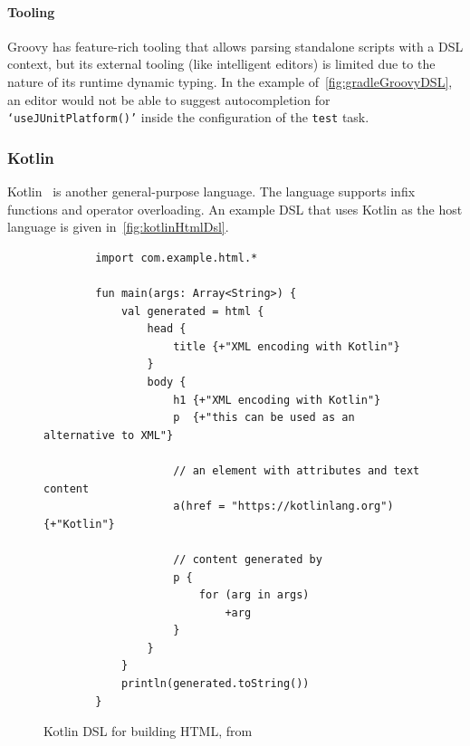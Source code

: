 \paragraph{Tooling} Groovy has feature-rich tooling that allows parsing standalone scripts with a DSL context, but its external tooling (like intelligent editors) is limited due to the nature of its runtime dynamic typing.
In the example of~\autoref{fig:gradleGroovyDSL}, an editor would not be able to suggest autocompletion for \texttt{`useJUnitPlatform()'} inside the configuration of the \texttt{test} task.

\subsubsection{Kotlin}\label{subsubsec:kotlinLang}

Kotlin~\cite{kotlinLang} is another general-purpose language.
The language supports infix functions and operator overloading.
An example DSL that uses Kotlin as the host language is given in~\autoref{fig:kotlinHtmlDsl}.

\begin{figure}[h]
    \centering
    \begin{minipage}{0.9\textwidth}
        \begin{verbatim}
        import com.example.html.*

        fun main(args: Array<String>) {
            val generated = html {
                head {
                    title {+"XML encoding with Kotlin"}
                }
                body {
                    h1 {+"XML encoding with Kotlin"}
                    p  {+"this can be used as an alternative to XML"}

                    // an element with attributes and text content
                    a(href = "https://kotlinlang.org") {+"Kotlin"}

                    // content generated by
                    p {
                        for (arg in args)
                            +arg
                    }
                }
            }
            println(generated.toString())
        }
        \end{verbatim}
    \end{minipage}
    \caption{Kotlin DSL for building HTML, from~\cite{kotlinTypeSafeBuilders}}
    \label{fig:kotlinHtmlDsl}
\end{figure}

